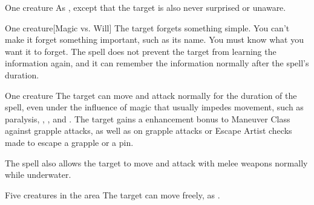 \begin{spelltarget}{One creature}
    \spelleffect As , except that the target is also never surprised or unaware.
\end{spelltarget}

\spellrng{\rngmed}
\spelldur{\durlong}
\begin{spelltarget}{One creature}[Magic vs. Will]
    \spelleffect The target forgets something simple. You can't make it forget something important, such as its name. You must know what you want it to forget. The spell does not prevent the target from learning the information again, and it can remember the information normally after the spell's duration.
\end{spelltarget}

\spellrng{\rngtouch}
\spelldur{\durshort}
\begin{spelltarget}{One creature}
    \spelleffect The target can move and attack normally for the duration of the spell, even under the influence of magic that usually impedes movement, such as paralysis, , , and . The target gains a  enhancement bonus to Maneuver Class against grapple attacks, as well as on grapple attacks or Escape Artist checks made to escape a grapple or a pin.
    \par The spell also allows the target to move and attack with melee weapons normally while underwater.
\end{spelltarget}

\begin{spelltargets}{Five creatures in the area}
    \spelleffect The target can move freely, as .
\end{spelltargets}

\begin{comment}
\subsubsection{G}
\end{comment}

